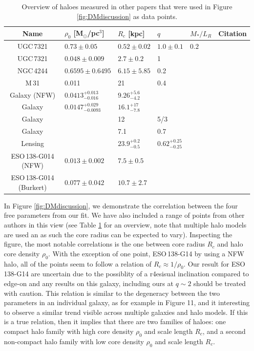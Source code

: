 \documentclass[useAMS,usenatbib]{mn2e}
\begin{document}
\begin{table}
\centering
	\begin{tabular}{c|llll|l}
	Name&$\rho_0$ [M$_\odot$/pc$^3$] & $R_c$ [kpc] & $q$& $M_* / L_R$ & Citation\\
	\hline\hline
	UGC\,7321 & $0.73\pm0.05$& $0.52\pm0.02$&$1.0\pm0.1$ & $0.2$ &\citet{OBrien2010D}\\
	UGC\,7321 & $0.048\pm0.009$ & $2.7\pm0.2$& 1&  &\citet{Banerjee2010A}\\
	NGC\,4244 & $0.6595\pm0.6495$ & $6.15\pm5.85$ & 0.2 & & \citet{Olling1996A}\\
	M\,31  &  0.011 & 21 & 0.4 & & \citet{Banerjee2008A}\\
	Galaxy (NFW) & $0.0413_{-0.016}^{+0.013}$ & $9.26_{-4.2}^{+5.6}$ & && \citet{Nesti2013}\\
	Galaxy & $0.0147_{-0.0093}^{+0.029}$ & $16.1_{-7.8}^{+17}$ && & \citet{Nesti2013}\\
	Galaxy & & 12 & 5/3 & & \citet{Helmi2004A}\\
	Galaxy & & 7.1 & 0.7 & & \citet{Olling2000}\\
	Lensing & & $23.9_{-0.5}^{+0.2}$ & $0.62_{-0.25}^{+0.25}$& &\citet{vanUitert2012}\\
	
	ESO\,138-G014 (NFW)&$0.013\pm0.002$&$7.5\pm0.5$& & & \citet{Hashim2014}\\
	ESO\,138-G014 (Burkert)&$0.077\pm0.042$&$10.7\pm2.7$& & & \citet{Hashim2014}\\
	\hline\hline
	\end{tabular}
\caption{Overview of haloes measured in other papers that were used in Figure \ref{fig:DMdiscussion} as data points.}\label{tbl:otherDM}
\end{table}

In Figure \ref{fig:DMdiscussion}, we demonstrate the correlation between the 
four free parameters from our fit. 
We have also included a range of points from other authors in this view 
(see Table \ref{tbl:otherDM} for an overview, note that multiple halo 
models are used an as such the core radius can be expected to vary).
Inspecting the figure, the most notable correlations is the one between 
core radius $R_c$ and halo core density $\rho_0$. 
With the exception of one point, ESO\,138-G14 by \citet{Hashim2014} using 
a NFW halo, all of the points seem to follow a relation of 
$R_c\approx1/\rho_0$. Our result for ESO\,138-G14 are uncertain due to
the possiblity of a r4esisual inclination compared to edge-on and any results
on this galaxy, including ours at $q\sim 2$ should be treated with caution. 
This relation is similar to the degeneracy between the two parameters in an 
individual galaxy, as for example in Figure 11, and 
it interesting to observe a similar trend visible across multiple galaxies 
and halo models. 
If this is a true relation, then it implies that there are two families of 
haloes: one compact halo family with high core density $\rho_0$ and scale 
length $R_c$, and a second non-compact halo family with low core density 
$\rho_0$ and scale length $R_c$. 
\end{document}
